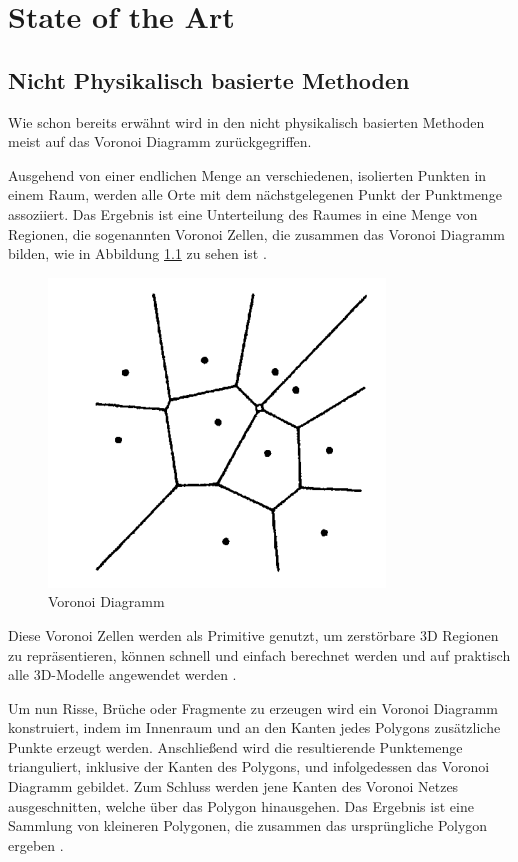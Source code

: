 \chapter{State of the Art}


\section{Nicht Physikalisch basierte Methoden}

Wie schon bereits erwähnt wird in den nicht physikalisch basierten Methoden meist auf das Voronoi Diagramm zurückgegriffen. 

Ausgehend von einer endlichen Menge an verschiedenen, isolierten Punkten in einem Raum, werden alle Orte mit dem nächstgelegenen Punkt der Punktmenge assoziiert.
Das Ergebnis ist eine Unterteilung des Raumes in eine Menge von Regionen, die sogenannten Voronoi Zellen, die zusammen das Voronoi Diagramm bilden, 
wie in Abbildung \ref{fig:voronoi1} zu sehen ist \cite{Okabe.SpatialTessellationsVoronoi}.


\begin{figure}[H]
    \centering
    \includegraphics[width=0.35\linewidth]{PICs/basicVoronoi.PNG}
    \caption{Voronoi Diagramm \protect\cite{Okabe.SpatialTessellationsVoronoi}}
    \label{fig:voronoi1}
\end{figure}

Diese Voronoi Zellen werden als Primitive genutzt, um zerstörbare 3D Regionen zu repräsentieren, können schnell und einfach berechnet werden und auf praktisch alle 3D-Modelle
angewendet werden \cite{Najim.DynamicFracturing}.

Um nun Risse, Brüche oder Fragmente zu erzeugen wird ein Voronoi Diagramm konstruiert, indem im Innenraum und an den Kanten jedes Polygons zusätzliche Punkte erzeugt werden. 
Anschließend wird die resultierende Punktemenge trianguliert, inklusive der Kanten des Polygons, und infolgedessen das Voronoi Diagramm gebildet. 
Zum Schluss werden jene Kanten des Voronoi Netzes ausgeschnitten, welche über das Polygon hinausgehen. Das Ergebnis ist eine Sammlung von kleineren Polygonen, die zusammen
das ursprüngliche Polygon ergeben \cite{Raghavachary.FractureGenerationOnPolygonalMeshes}.

